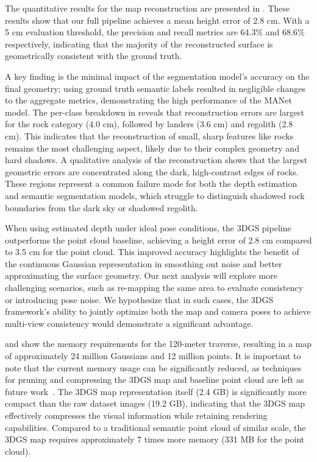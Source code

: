 The quantitative results for the map reconstruction are presented in . These results show that our full pipeline achieves a mean height error of 2.8 cm. With a 5 cm evaluation threshold, the precision and recall metrics are 64.3\% and 68.6\% respectively, indicating that the majority of the reconstructed surface is geometrically consistent with the ground truth.

A key finding is the minimal impact of the segmentation model's accuracy on the final geometry; using ground truth semantic labels resulted in negligible changes to the aggregate metrics, demonstrating the high performance of the MANet model. The per-class breakdown in  reveals that reconstruction errors are largest for the rock category (4.0 cm), followed by landers (3.6 cm) and regolith (2.8 cm). This indicates that the reconstruction of small, sharp features like rocks remains the most challenging aspect, likely due to their complex geometry and hard shadows.
A qualitative analysis of the reconstruction shows that the largest geometric errors are concentrated along the dark, high-contrast edges of rocks. These regions represent a common failure mode for both the depth estimation and semantic segmentation models, which struggle to distinguish shadowed rock boundaries from the dark sky or shadowed regolith.

When using estimated depth under ideal pose conditions, the 3DGS pipeline outperforms the point cloud baseline, achieving a height error of 2.8 cm compared to 3.5 cm for the point cloud. This improved accuracy highlights the benefit of the continuous Gaussian representation in smoothing out noise and better approximating the surface geometry. Our next analysis will explore more challenging scenarios, such as re-mapping the same area to evaluate consistency or introducing pose noise. We hypothesize that in such cases, the 3DGS framework's ability to jointly optimize both the map and camera poses to achieve multi-view consistency would demonstrate a significant advantage.

 and  show the memory requirements for the 120-meter traverse, resulting in a map of approximately 24 million Gaussians and 12 million points. It is important to note that the current memory usage can be significantly reduced, as techniques for pruning and compressing the 3DGS map and baseline point cloud are left as future work~\cite{bagdasarian_3dgszip_2025}. The 3DGS map representation itself (2.4 GB) is significantly more compact than the raw dataset images (19.2 GB), indicating that the 3DGS map effectively compresses the visual information while retaining rendering capabilities. Compared to a traditional semantic point cloud of similar scale, the 3DGS map requires approximately 7 times more memory (331 MB for the point cloud).

